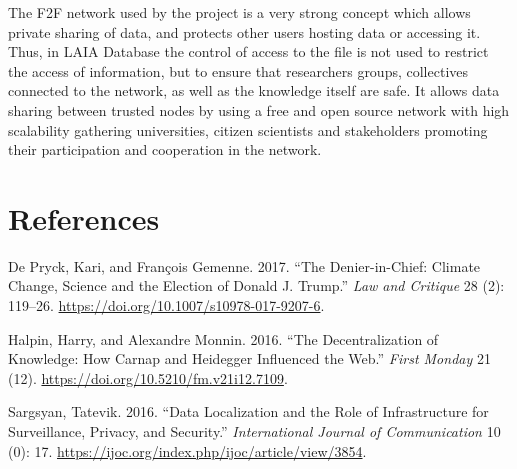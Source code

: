 \documentclass[conference,final,]{IEEEtran}
\begin{document}
The F2F network used by the project is a very strong concept which
allows private sharing of data, and protects other users hosting
data or accessing it. Thus, in LAIA Database the control of access
to the file is not used to restrict the access of information, but
to ensure that researchers groups, collectives connected to the network,
as well as the knowledge itself are safe. It allows data sharing between
trusted nodes by using a free and open source network with high
scalability gathering universities, citizen scientists and stakeholders
promoting their participation and cooperation in the network.

\newpage

\hypertarget{references}{%
\section*{References}\label{references}}

\hypertarget{refs}{}
\leavevmode\hypertarget{ref-de_pryck_denier_2017}{}%
De Pryck, Kari, and François Gemenne. 2017. ``The Denier-in-Chief:
Climate Change, Science and the Election of Donald J. Trump.'' \emph{Law
and Critique} 28 (2): 119--26.
\url{https://doi.org/10.1007/s10978-017-9207-6}.

\leavevmode\hypertarget{ref-halpin_decentralization_2016}{}%
Halpin, Harry, and Alexandre Monnin. 2016. ``The Decentralization of
Knowledge: How Carnap and Heidegger Influenced the Web.'' \emph{First
Monday} 21 (12). \url{https://doi.org/10.5210/fm.v21i12.7109}.

\leavevmode\hypertarget{ref-sargsyan_data_2016}{}%
Sargsyan, Tatevik. 2016. ``Data Localization and the Role of
Infrastructure for Surveillance, Privacy, and Security.''
\emph{International Journal of Communication} 10 (0): 17.
\url{https://ijoc.org/index.php/ijoc/article/view/3854}.
\end{document}
